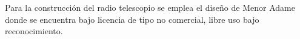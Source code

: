 Para la construcción del radio telescopio se emplea el diseño de Menor Adame
\cite{MenorAdame2018} donde se encuentra bajo licencia de tipo no
comercial, libre uso bajo reconocimiento.
